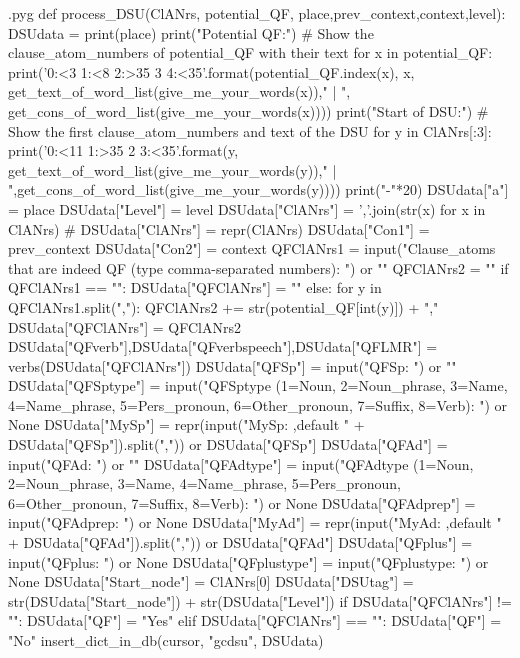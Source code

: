 \documentclass{report}
\makeatletter
\newenvironment{python}{%
  \VerbatimEnvironment
  \minted@resetoptions
  \setkeys{minted@opt}{}
      \begin{VerbatimOut}{\jobname.pyg}}
{%
      \end{VerbatimOut}
      \minted@pygmentize{python}
      \DeleteFile{\jobname.pyg}}
\makeatother
\begin{document}
\begin{python}
def process_DSU(ClANrs, potential_QF, place,prev_context,context,level):
    DSUdata = {}
    print(place)
    print("Potential QF:")  # Show the clause_atom_numbers of potential_QF with their text
    for x in potential_QF:
        print('{0:<3} {1:<8} {2:>35} {3} {4:<35}'.format(potential_QF.index(x), x, get_text_of_word_list(give_me_your_words(x))," | ", get_cons_of_word_list(give_me_your_words(x))))
    print("Start of DSU:")  # Show the first clause_atom_numbers and text of the DSU
    for y in ClANrs[:3]:
        print('{0:<11} {1:>35} {2} {3:<35}'.format(y, get_text_of_word_list(give_me_your_words(y))," | ",get_cons_of_word_list(give_me_your_words(y))))
    print("-"*20)
    DSUdata["a"] = place
    DSUdata["Level"] = level
    DSUdata["ClANrs"] = ','.join(str(x) for x in ClANrs)
#    DSUdata["ClANrs"] = repr(ClANrs)
    DSUdata["Con1"] = prev_context
    DSUdata["Con2"] = context
    QFClANrs1 = input("Clause_atoms that are indeed QF (type comma-separated numbers): ") or ""
    QFClANrs2 = ""
    if QFClANrs1 == "":
        DSUdata["QFClANrs"] = ""
    else:
        for y in QFClANrs1.split(","):
            QFClANrs2 += str(potential_QF[int(y)]) + ","
        DSUdata["QFClANrs"] = QFClANrs2
    DSUdata["QFverb"],DSUdata["QFverbspeech"],DSUdata["QFLMR"] = verbs(DSUdata["QFClANrs"])
    DSUdata["QFSp"] = input("QFSp: ") or ""
    DSUdata["QFSptype"] = input("QFSptype (1=Noun, 2=Noun_phrase, 3=Name, 4=Name_phrase, 5=Pers_pronoun, 6=Other_pronoun, 7=Suffix, 8=Verb): ") or None
    DSUdata["MySp"] = repr(input("MySp: ,default " + DSUdata["QFSp"]).split(",")) or DSUdata["QFSp"]
    DSUdata["QFAd"] = input("QFAd: ") or ""
    DSUdata["QFAdtype"] = input("QFAdtype (1=Noun, 2=Noun_phrase, 3=Name, 4=Name_phrase, 5=Pers_pronoun, 6=Other_pronoun, 7=Suffix, 8=Verb): ") or None
    DSUdata["QFAdprep"] = input("QFAdprep: ") or None
    DSUdata["MyAd"] = repr(input("MyAd: ,default " + DSUdata["QFAd"]).split(",")) or DSUdata["QFAd"]
    DSUdata["QFplus"] = input("QFplus: ") or None
    DSUdata["QFplustype"] = input("QFplustype: ") or None
    DSUdata["Start_node"] = ClANrs[0]
    DSUdata["DSUtag"] = str(DSUdata["Start_node"]) + str(DSUdata["Level"])
    if DSUdata["QFClANrs"] != "":
        DSUdata["QF"] = "Yes"
    elif DSUdata["QFClANrs"] == "":
        DSUdata["QF"] = "No"
    insert_dict_in_db(cursor, "gcdsu", DSUdata)

\end{python}
\end{document}
